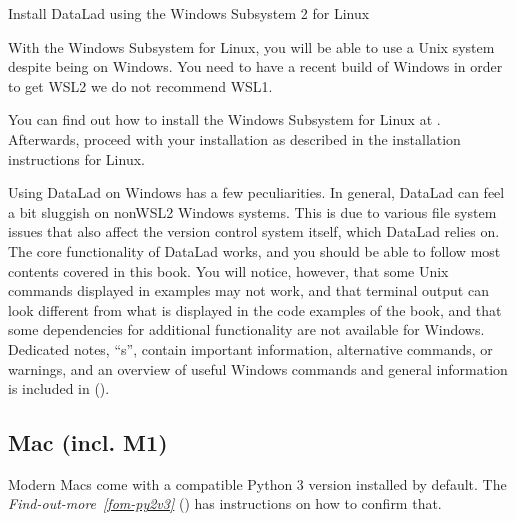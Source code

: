 \ignorespaces \begin{windowswit}[label={ww-wsl2}, before title={\thetcbcounter\ }, check odd page=true]{Install DataLad using the Windows Subsystem 2 for Linux}
\label{\detokenize{intro/installation:ww-wsl2}}

\sphinxAtStartPar
With the Windows Subsystem for Linux, you will be able to use a Unix system
despite being on Windows.  You need to have a recent build of Windows in
order to get WSL2 \textendash{} we do not recommend WSL1.

\sphinxAtStartPar
You can find out how to install the Windows Subsystem for Linux at
.
Afterwards, proceed with your installation as described in the installation instructions
for Linux.


\end{windowswit}

\sphinxAtStartPar
Using DataLad on Windows has a few peculiarities. In general, DataLad can feel a bit
sluggish on non\sphinxhyphen{}WSL2 Windows systems. This is due to various file system issues
that also affect the version control system {\hyperref[\detokenize{glossary:term-Git}]{}} itself, which DataLad
relies on. The core functionality of DataLad works, and you should be able to
follow most contents covered in this book.  You will notice, however, that some
Unix commands displayed in examples may not work, and that terminal output can
look different from what is displayed in the code examples of the book, and
that some dependencies for additional functionality are not available for
Windows. Dedicated notes,
“s”, contain important information, alternative commands, or
warnings, and an overview of useful Windows commands and general information is included in {\hyperref[\detokenize{intro/howto:howto}]{}} ().

\ignorespaces 

\subsection{Mac (incl. M1)}
\label{\detokenize{intro/installation:mac-incl-m1}}\label{\detokenize{intro/installation:mac}}\label{\detokenize{intro/installation:index-8}}
\sphinxAtStartPar
Modern Macs come with a compatible Python 3 version installed by default. The
\textit{Find-out-more}~{\findoutmoreiconinline}\textit{\ref{fom-py2v3}} {\hyperref[\detokenize{intro/installation:fom-py2v3}]{}} () has instructions on how to
confirm that.

